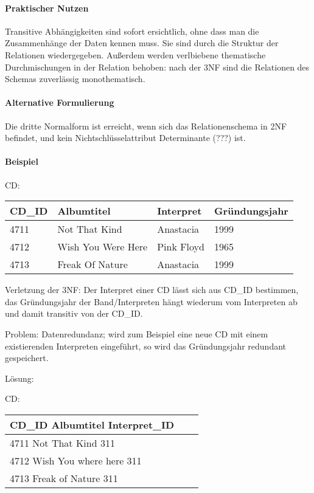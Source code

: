 \documentclass{scrbook}
\begin{document}
\paragraph{Praktischer Nutzen}
Transitive Abhängigkeiten sind sofort ersichtlich, ohne dass man die Zusammenhänge der Daten kennen muss.
Sie sind durch die Struktur der Relationen wiedergegeben.
Außerdem werden verlbiebene thematische Durchmischungen in der Relation behoben:
nach der 3NF sind die Relationen des Schemas zuverlässig monothematisch.

\paragraph{Alternative Formulierung}
Die dritte Normalform ist erreicht, wenn sich das Relationenschema in 2NF befindet, 
und kein Nichtschlüsselattribut Determinante (???) ist.


\paragraph{Beispiel}

CD:\\
\begin{tabular}{| l | l | l | l |}
\hline
CD\_ID	& Albumtitel			& Interpret		& Gründungsjahr \\
\hline
4711	& Not That Kind			& Anastacia		& 1999 \\
4712	& Wish You Were Here	& Pink Floyd	& 1965 \\
4713	& Freak Of Nature		& Anastacia		& 1999 \\
\hline
\end{tabular}

Verletzung der 3NF:
Der Interpret einer CD lässt sich aus CD\_ID bestimmen, 
das Gründungsjahr der Band/Interpreten hängt wiederum vom Interpreten ab und damit
transitiv von der CD\_ID.

Problem:
Datenredundanz; wird zum Beispiel eine neue CD mit einem existierenden Interpreten eingeführt,
so wird das Gründungsjahr redundant gespeichert.

Lösung:

CD:\\
\begin{tabular}{| l | l | l |}
\hline
CD\_ID	Albumtitel				Interpret\_ID \\
\hline
4711	Not That Kind			311 \\
4712	Wish You where here		311 \\
4713	Freak of Nature			311 \\
\hline
\end{tabular}
\end{document}
